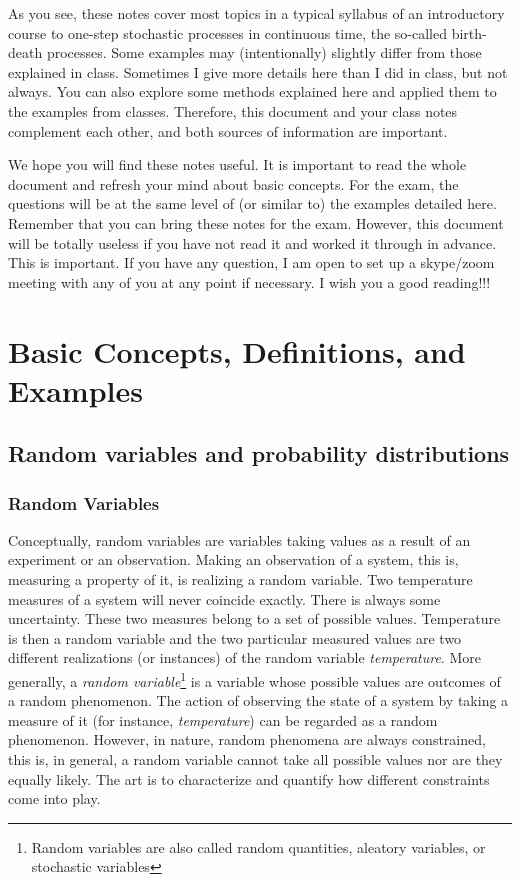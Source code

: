 \documentclass{article}
\begin{document}
As you see, these notes cover most topics in a typical syllabus of an introductory course to one-step stochastic processes in continuous time, the so-called birth-death processes. Some examples may (intentionally) slightly differ from those explained in class. Sometimes I give more details here than I did in class, but not always. You can also explore some methods explained here and applied them to the examples from classes. Therefore, this document and your class notes complement each other, and both sources of information are important. 
\smallskip

We hope you will find these notes useful. It is important to read the whole document and refresh your mind about basic concepts.  For the exam, the questions will be at the same level of (or similar to) the examples detailed here. Remember that you can bring these notes for the exam. However, this document will be totally useless if you have not read it and worked it through in advance. This is important. If you have any question, I am open to set up a skype/zoom meeting with any of you at any point if necessary. I wish you a good reading!!!

\section{Basic Concepts, Definitions, and Examples}

\subsection{Random variables and probability distributions}

\subsubsection{Random Variables}
Conceptually, random variables are variables taking values as a result of an experiment or an observation. Making an observation of a system, this is, measuring a property of it, is realizing a random variable. Two temperature measures of a system will never coincide exactly. There is always some uncertainty. These two measures belong to a set of possible values. Temperature is then a random variable and the two particular measured values are two different realizations (or instances) of the random variable {\it temperature}. More generally, a {\it random variable}\footnote{Random variables are also called random quantities, aleatory variables, or stochastic variables} is a variable whose possible values are outcomes of a random phenomenon. The action of observing the state of a system by taking a measure of it (for instance, {\it temperature}) can be regarded as a random phenomenon. However, in nature, random phenomena are always constrained, this is, in general, a random variable cannot take all possible values nor are they equally likely. The art is to characterize and quantify how different constraints come into play.  
\smallskip
\end{document}
